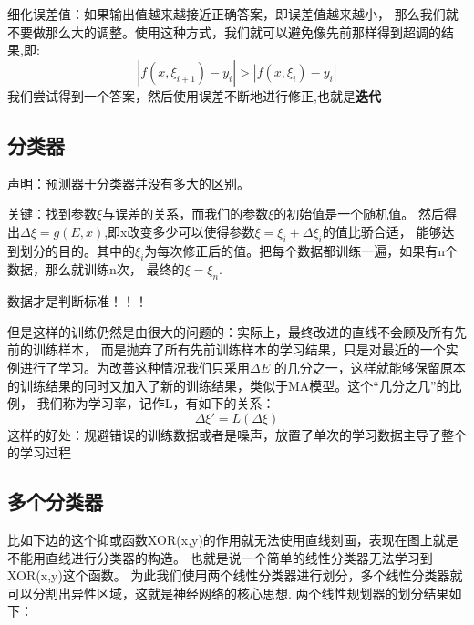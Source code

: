 \documentclass[12pt]{article}
\begin{document}
    \vspace{1em}
    细化误差值：如果输出值越来越接近正确答案，即误差值越来越小，
    那么我们就不要做那么大的调整。使用这种方式，我们就可以避免像先前那样得到超调的结果,即:
    \begin{equation}
        |f(x,\xi_{i+1})-y_i|>|f(x,\xi_{i})-y_i|
    \end{equation}
    我们尝试得到一个答案，然后使用误差不断地进行修正,也就是\textbf{迭代}

    \subsection{分类器}
    声明：预测器于分类器并没有多大的区别。

    关键：找到参数$\xi$与误差的关系，而我们的参数$\xi$的初始值是一个随机值。
    然后得出$\Delta \xi=g(E,x)$,即x改变多少可以使得参数$\xi=\xi_{i}+\Delta\xi_i$的值比骄合适，
    能够达到划分的目的。其中的$\xi_{i}$为每次修正后的值。把每个数据都训练一遍，如果有n个数据，那么就训练n次，
    最终的$\xi=\xi_{n}$.

    数据才是判断标准！！！
    
    但是这样的训练仍然是由很大的问题的：实际上，最终改进的直线不会顾及所有先前的训练样本，
    而是抛弃了所有先前训练样本的学习结果，只是对最近的一个实例进行了学习。为改善这种情况我们只采用$\Delta E$
    的几分之一，这样就能够保留原本的训练结果的同时又加入了新的训练结果，类似于MA模型。这个“几分之几”的比例，
    我们称为学习率，记作L，有如下的关系：
    \begin{equation}
        \Delta \xi' =L(\Delta \xi)
    \end{equation}
    这样的好处：规避错误的训练数据或者是噪声，放置了单次的学习数据主导了整个的学习过程

    \subsection{多个分类器}
    比如下边的这个抑或函数XOR(x,y)的作用就无法使用直线刻画，表现在图上就是不能用直线进行分类器的构造。
    也就是说一个简单的线性分类器无法学习到XOR(x,y)这个函数。
    为此我们使用两个线性分类器进行划分，多个线性分类器就可以分割出异性区域，这就是神经网络的核心思想.
    两个线性规划器的划分结果如下：
\end{document}
